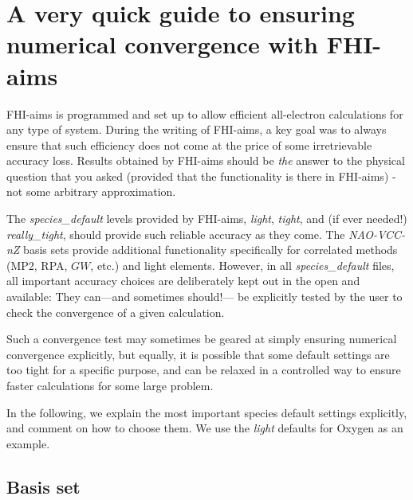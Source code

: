 \section{A very quick guide to ensuring numerical convergence with FHI-aims}

FHI-aims is programmed and set up to allow efficient all-electron calculations
for any type of system. During the writing of FHI-aims, a key goal was to
always ensure that such efficiency does not come at the price of some
irretrievable accuracy loss. Results obtained by FHI-aims should be
\emph{the} answer to the physical question that you asked (provided that the
functionality is there in FHI-aims) - not some arbitrary approximation. 

The \emph{species\_default} levels provided by FHI-aims, \emph{light},
\emph{tight}, and (if ever needed!) \emph{really\_tight}, should provide such
reliable accuracy as they come. The \emph{NAO-VCC-nZ} basis sets
provide additional functionality specifically for correlated methods
(MP2, RPA, $GW$, etc.) and light elements. However, in all
\emph{species\_default} files, all important accuracy choices are
deliberately kept out in the open and available: They can---and
sometimes should!--- be explicitly tested by the user to check the
convergence of a given calculation.  

Such a convergence test may sometimes be geared at simply
ensuring numerical convergence explicitly, but equally, it is possible that
some default settings are too tight for a specific purpose, and can be
relaxed in a controlled way to ensure faster calculations for some large
problem. 

In the following, we explain the most important species default settings
explicitly, and comment on how to choose them. We use the \emph{light}
defaults for Oxygen as an example.

\subsection{Basis set}

